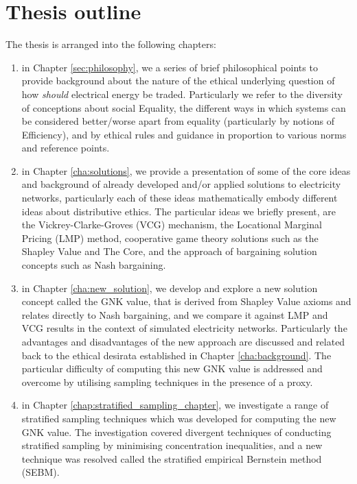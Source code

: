 \section{Thesis outline}
The thesis is arranged into the following chapters:
\begin{enumerate}
\item in Chapter \ref{sec:philosophy}, we a series of brief philosophical points to provide background about the nature of the ethical underlying question of how \textit{should} electrical energy be traded. Particularly we refer to the diversity of conceptions about social Equality, the different ways in which systems can be considered better/worse apart from equality (particularly by notions of Efficiency), and by ethical rules and guidance in proportion to various norms and reference points. 
\item in Chapter \ref{cha:solutions}, we provide a presentation of some of the core ideas and background of already developed and/or applied solutions to electricity networks, particularly each of these ideas mathematically embody different ideas about distributive ethics. The particular ideas we briefly present, are the Vickrey-Clarke-Groves (VCG) mechanism, the Locational Marginal Pricing (LMP) method, cooperative game theory solutions such as the Shapley Value and The Core, and the approach of bargaining solution concepts such as Nash bargaining. 
\item in Chapter \ref{cha:new_solution}, we develop and explore a new solution concept called the GNK value, that is derived from Shapley Value axioms and relates directly to Nash bargaining, and we compare it against LMP and VCG results in the context of simulated electricity networks. Particularly the advantages and disadvantages of the new approach are discussed and related back to the ethical desirata established in Chapter \ref{cha:background}. The particular difficulty of computing this new GNK value is addressed and overcome by utilising sampling techniques in the presence of a proxy.
\item in Chapter \ref{chap:stratified_sampling_chapter}, we investigate a range of stratified sampling techniques which was developed for computing the new GNK value. The investigation covered divergent techniques of conducting stratified sampling by minimising concentration inequalities, and a new technique was resolved called the stratified empirical Bernstein method (SEBM).
\end{enumerate}




